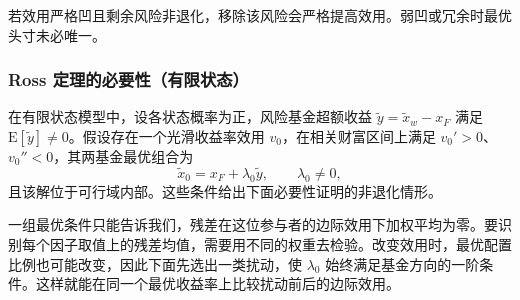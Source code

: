 若效用严格凹且剩余风险非退化，移除该风险会严格提高效用。弱凹或冗余时最优头寸未必唯一。

\subsubsection{Ross 定理的必要性（有限状态）}
在有限状态模型中，设各状态概率为正，风险基金超额收益 $\tilde y=\tilde x_w-x_F$ 满足 $\mathrm E[\tilde y]\ne0$。假设存在一个光滑收益率效用 $v_0$，在相关财富区间上满足 $v_0'>0$、$v_0''<0$，其两基金最优组合为
\[
 \tilde x_0=x_F+\lambda_0\tilde y,\qquad \lambda_0\ne0,
\]
且该解位于可行域内部。这些条件给出下面必要性证明的非退化情形。

一组最优条件只能告诉我们，残差在这位参与者的边际效用下加权平均为零。要识别每个因子取值上的残差均值，需要用不同的权重去检验。改变效用时，最优配置比例也可能改变，因此下面先选出一类扰动，使 $\lambda_0$ 始终满足基金方向的一阶条件。这样就能在同一个最优收益率上比较扰动前后的边际效用。

